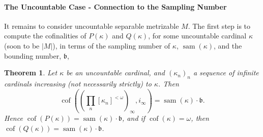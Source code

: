 \documentclass{article}
\newtheorem{thm}{Theorem}[section]
\DeclareMathOperator{\cof}{cof}
\begin{document}
\paragraph{The Uncountable Case - Connection to the Sampling Number}

It remains to consider uncountable separable metrizable $M$. The first step is to compute the cofinalities of $P(\kappa)$ and $Q(\kappa)$, for some uncountable cardinal $\kappa$ (soon to be $|M|$), in terms of the sampling number of $\kappa$, $\mathop{sam}(\kappa)$, and the bounding number, $\mathfrak{b}$,
\begin{thm}\label{th:cof_Pkappa}
Let $\kappa$ be an uncountable cardinal, and $(\kappa_n)_n$ a sequence of infinite cardinals increasing (not necessarily strictly) to $\kappa$. 
Then 
\[\cof((\prod_n [\kappa_n]^{<\omega})_\infty,i_\infty)
= \mathop{sam}(\kappa)\cdot \mathfrak{b}. 
\]
Hence $\cof(P(\kappa))= \mathop{sam}(\kappa)\cdot\mathfrak{b}$, and if $\cof(\kappa)=\omega$, then $\cof(Q(\kappa))=\mathop{sam}(\kappa)\cdot\mathfrak{b}$.    
\end{thm}
\end{document}
